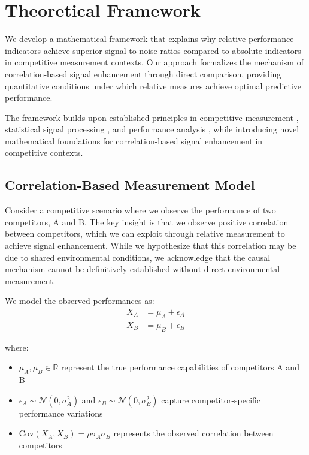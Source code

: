 \section{Theoretical Framework}

We develop a mathematical framework that explains why relative performance indicators achieve superior signal-to-noise ratios compared to absolute indicators in competitive measurement contexts. Our approach formalizes the mechanism of correlation-based signal enhancement through direct comparison, providing quantitative conditions under which relative measures achieve optimal predictive performance.

The framework builds upon established principles in competitive measurement \cite{keiningham2015competitive}, statistical signal processing \cite{boll1979suppression}, and performance analysis \cite{hughes2002performance}, while introducing novel mathematical foundations for correlation-based signal enhancement in competitive contexts.

\subsection{Correlation-Based Measurement Model}

Consider a competitive scenario where we observe the performance of two competitors, A and B. The key insight is that we observe positive correlation between competitors, which we can exploit through relative measurement to achieve signal enhancement. While we hypothesize that this correlation may be due to shared environmental conditions, we acknowledge that the causal mechanism cannot be definitively established without direct environmental measurement.

We model the observed performances as:
\begin{align}
X_A &= \mu_A + \epsilon_A \label{eq:model_a_corr} \\
X_B &= \mu_B + \epsilon_B \label{eq:model_b_corr}
\end{align}

where:
\begin{itemize}
    \item $\mu_A, \mu_B \in \mathbb{R}$ represent the true performance capabilities of competitors A and B
    \item $\epsilon_A \sim \mathcal{N}(0, \sigma_A^2)$ and $\epsilon_B \sim \mathcal{N}(0, \sigma_B^2)$ capture competitor-specific performance variations
    \item $\text{Cov}(X_A, X_B) = \rho\sigma_A\sigma_B$ represents the observed correlation between competitors
\end{itemize}

